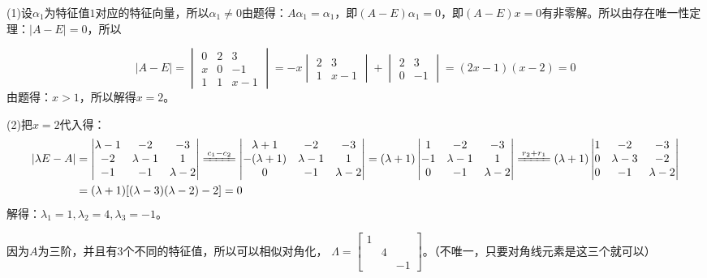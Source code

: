 \documentclass{article}
\begin{document}
\begin{jie}
(1)设$\alpha_1$为特征值$1$对应的特征向量，所以$\alpha_1\neq 0$由题得：$A\alpha_1=\alpha_1$，即$(A-E)\alpha_1=0$，即$(A-E)x=0$有非零解。所以由存在唯一性定理：$|A-E|=0$，所以

\begin{equation*}
|A-E|=
\begin{vmatrix}
  0 & 2 & 3 \\
  x & 0 & -1 \\
  1 & 1 & x-1
\end{vmatrix}=-x
\begin{vmatrix}
 2 & 3 \\
1 & x-1
\end{vmatrix}+
\begin{vmatrix}
 2 & 3 \\
0 & -1
\end{vmatrix}=(2x-1)(x-2)=0
\end{equation*}
由题得：$x>1$，所以解得$x=2$。

(2)把$x=2$代入得：
\begin{align*}
|\lambda E-A|&=
\begin{vmatrix}
  \lambda-1 & -2 & -3 \\
  -2 & \lambda-1 & 1 \\
  -1 & -1 & \lambda-2
\end{vmatrix}\xlongequal{c_{1}-c_{2}}
\begin{vmatrix}
  \lambda+1 & -2 & -3 \\
  -(\lambda+1) & \lambda-1 & 1 \\
  0 & -1 & \lambda-2
\end{vmatrix}=(\lambda+1)
\begin{vmatrix}
  1 & -2 & -3 \\
  -1 & \lambda-1 & 1 \\
  0 & -1 & \lambda-2
\end{vmatrix}\xlongequal{r_{2}+r_{1}}
(\lambda+1)
\begin{vmatrix}
  1 & -2 & -3 \\
  0 & \lambda-3 & -2 \\
  0 & -1 & \lambda-2
\end{vmatrix}\\
&=(\lambda+1)[(\lambda-3)(\lambda-2)-2]=0
\end{align*}
解得：$\lambda_1=1,\lambda_2=4,\lambda_3=-1$。

因为$A$为三阶，并且有3个不同的特征值，所以可以相似对角化，
$
\Lambda=
\begin{bmatrix}
  1 & & \\
    & 4 &\\
    &&-1
\end{bmatrix}
$。\textcolor[rgb]{1.00,0.00,0.00}{（不唯一，只要对角线元素是这三个就可以）}
\end{jie}
\end{document}
